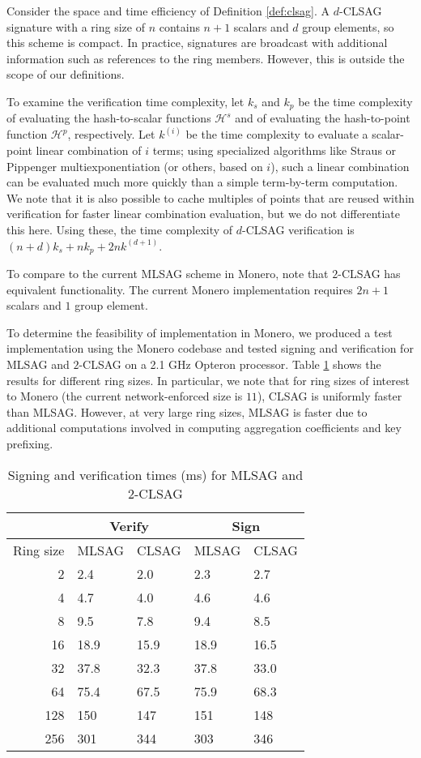 \documentclass{mrl}
\theoremstyle{plain}
\theoremstyle{definition}
\begin{document}
Consider the space and time efficiency of Definition \ref{def:clsag}. A $d$-CLSAG signature with a ring size of $n$ contains $n+1$ scalars and $d$ group elements, so this scheme is compact. In practice, signatures are broadcast with additional information such as references to the ring members. However, this is outside the scope of our definitions.

To examine the verification time complexity, let $k_s$ and $k_p$ be the time complexity of evaluating the hash-to-scalar functions $\mathcal{H}^s$ and of evaluating the hash-to-point function $\mathcal{H}^p$, respectively. Let $k^{(i)}$ be the time complexity to evaluate a scalar-point linear combination of $i$ terms; using specialized algorithms like Straus or Pippenger multiexponentiation (or others, based on $i$), such a linear combination can be evaluated much more quickly than a simple term-by-term computation. We note that it is also possible to cache multiples of points that are reused within verification for faster linear combination evaluation, but we do not differentiate this here. Using these, the time complexity of $d$-CLSAG verification is $(n+d)k_s + nk_p + 2nk^{(d+1)}$.

To compare to the current MLSAG scheme in Monero, note that $2$-CLSAG has equivalent functionality. The current Monero implementation requires $2n+1$ scalars and $1$ group element. 

To determine the feasibility of implementation in Monero, we produced a test implementation using the Monero codebase and tested signing and verification for MLSAG and $2$-CLSAG on a 2.1 GHz Opteron processor. Table \ref{table:timing} shows the results for different ring sizes. In particular, we note that for ring sizes of interest to Monero (the current network-enforced size is $11$), CLSAG is uniformly faster than MLSAG. However, at very large ring sizes, MLSAG is faster due to additional computations involved in computing aggregation coefficients and key prefixing.

\begin{table}[htp]
\begin{center}
\begin{tabular}{r|ll|ll}
& \multicolumn{2}{c|}{Verify} & \multicolumn{2}{c}{Sign} \\
\hline
Ring size & MLSAG & CLSAG & MLSAG & CLSAG \\
\hline
2 & 2.4 & 2.0 & 2.3 & 2.7 \\
4 & 4.7 & 4.0 & 4.6 & 4.6 \\
8 & 9.5 & 7.8 & 9.4 & 8.5 \\
16 & 18.9 & 15.9 & 18.9 & 16.5 \\
32 & 37.8 & 32.3 & 37.8 & 33.0 \\
64 & 75.4 & 67.5 & 75.9 & 68.3 \\
128 & 150 & 147 & 151 & 148 \\
256 & 301 & 344 & 303 & 346
\end{tabular}
\end{center}
\caption{Signing and verification times (ms) for MLSAG and $2$-CLSAG}
\label{table:timing}
\end{table}
\end{document}
